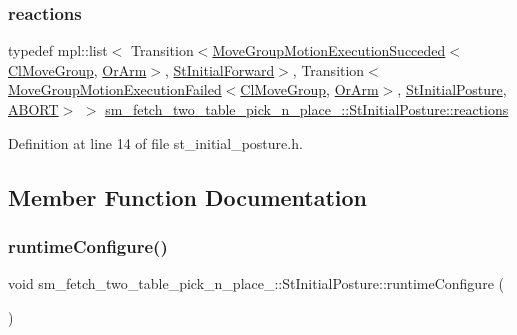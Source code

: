 \subsubsection{\texorpdfstring{reactions}{reactions}}
{\footnotesize\ttfamily typedef mpl\+::list$<$ Transition$<$\hyperlink{structmove__group__interface__client_1_1MoveGroupMotionExecutionSucceded}{Move\+Group\+Motion\+Execution\+Succeded}$<$\hyperlink{classmove__group__interface__client_1_1ClMoveGroup}{Cl\+Move\+Group}, \hyperlink{classsm__fetch__two__table__pick__n__place__1_1_1OrArm}{Or\+Arm}$>$, \hyperlink{structsm__fetch__two__table__pick__n__place__1_1_1StInitialForward}{St\+Initial\+Forward}$>$, Transition$<$\hyperlink{structmove__group__interface__client_1_1MoveGroupMotionExecutionFailed}{Move\+Group\+Motion\+Execution\+Failed}$<$\hyperlink{classmove__group__interface__client_1_1ClMoveGroup}{Cl\+Move\+Group}, \hyperlink{classsm__fetch__two__table__pick__n__place__1_1_1OrArm}{Or\+Arm}$>$, \hyperlink{structsm__fetch__two__table__pick__n__place__1_1_1StInitialPosture}{St\+Initial\+Posture}, \hyperlink{classABORT}{A\+B\+O\+RT}$>$ $>$ \hyperlink{structsm__fetch__two__table__pick__n__place__1_1_1StInitialPosture_a5f6d4f675c40feb34ba0c8aa337a56a0}{sm\+\_\+fetch\+\_\+two\+\_\+table\+\_\+pick\+\_\+n\+\_\+place\+\_\+::\+St\+Initial\+Posture\+::reactions}}



Definition at line 14 of file st\+\_\+initial\+\_\+posture.\+h.



\subsection{Member Function Documentation}
\mbox{\label{structsm__fetch__two__table__pick__n__place__1_1_1StInitialPosture_acd29616c14e982ecf66a33f44b92242c}} 
\subsubsection{\texorpdfstring{runtime\+Configure()}{runtimeConfigure()}}
{\footnotesize\ttfamily void sm\+\_\+fetch\+\_\+two\+\_\+table\+\_\+pick\+\_\+n\+\_\+place\+\_\+::\+St\+Initial\+Posture\+::runtime\+Configure (\begin{DoxyParamCaption}{ }\end{DoxyParamCaption})\hspace{0.3cm}{\ttfamily [inline]}}




